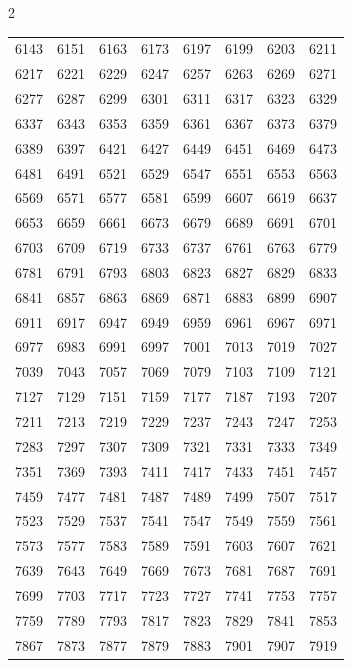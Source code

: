 \documentclass{article}
\begin{document}
\begin{multicols}{2}
\begin{tabular}{r r r r r r r r}
6143 & 6151 & 6163 & 6173 & 6197 & 6199 & 6203 & 6211\\
6217 & 6221 & 6229 & 6247 & 6257 & 6263 & 6269 & 6271\\
6277 & 6287 & 6299 & 6301 & 6311 & 6317 & 6323 & 6329\\
6337 & 6343 & 6353 & 6359 & 6361 & 6367 & 6373 & 6379\\
6389 & 6397 & 6421 & 6427 & 6449 & 6451 & 6469 & 6473\\
6481 & 6491 & 6521 & 6529 & 6547 & 6551 & 6553 & 6563\\
6569 & 6571 & 6577 & 6581 & 6599 & 6607 & 6619 & 6637\\
6653 & 6659 & 6661 & 6673 & 6679 & 6689 & 6691 & 6701\\
6703 & 6709 & 6719 & 6733 & 6737 & 6761 & 6763 & 6779\\
6781 & 6791 & 6793 & 6803 & 6823 & 6827 & 6829 & 6833\\
6841 & 6857 & 6863 & 6869 & 6871 & 6883 & 6899 & 6907\\
6911 & 6917 & 6947 & 6949 & 6959 & 6961 & 6967 & 6971\\
6977 & 6983 & 6991 & 6997 & 7001 & 7013 & 7019 & 7027\\
7039 & 7043 & 7057 & 7069 & 7079 & 7103 & 7109 & 7121\\
7127 & 7129 & 7151 & 7159 & 7177 & 7187 & 7193 & 7207\\
7211 & 7213 & 7219 & 7229 & 7237 & 7243 & 7247 & 7253\\
7283 & 7297 & 7307 & 7309 & 7321 & 7331 & 7333 & 7349\\
7351 & 7369 & 7393 & 7411 & 7417 & 7433 & 7451 & 7457\\
7459 & 7477 & 7481 & 7487 & 7489 & 7499 & 7507 & 7517\\
7523 & 7529 & 7537 & 7541 & 7547 & 7549 & 7559 & 7561\\
7573 & 7577 & 7583 & 7589 & 7591 & 7603 & 7607 & 7621\\
7639 & 7643 & 7649 & 7669 & 7673 & 7681 & 7687 & 7691\\
7699 & 7703 & 7717 & 7723 & 7727 & 7741 & 7753 & 7757\\
7759 & 7789 & 7793 & 7817 & 7823 & 7829 & 7841 & 7853\\
7867 & 7873 & 7877 & 7879 & 7883 & 7901 & 7907 & 7919\\
\end{tabular}


\end{multicols}
\end{document}
